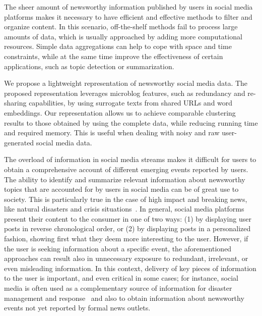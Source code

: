 The sheer amount of newsworthy information published by users in social media
platforms makes it necessary to have efficient and effective methods to filter
and organize content. 
%
In this scenario, off-the-shelf methods fail to process large amounts of data,
which is usually approached by adding more computational resources. 
%
Simple data aggregations can help to cope with space and time constraints,
while at the same time improve the effectiveness of certain applications, such
as topic detection or summarization. 


%
We propose a lightweight representation of newsworthy social media data. 
%
The proposed representation leverages microblog features, such as redundancy
and re-sharing capabilities, by using surrogate texts from shared URLs and word embeddings.
%
Our representation allows us to achieve comparable clustering results to 
those obtained by using the complete data, while reducing running time and 
required memory.
%
This is useful when dealing with noisy and raw user-generated social media data.


The overload of information in social media streams makes it difficult for users
to obtain a comprehensive account of different emerging events reported by
users.
%
%
The ability to identify and summarize relevant information about newsworthy
topics that are accounted for by users in social media can be of great use to
society.
%
This is particularly true in the case of high impact and breaking news, like
natural disasters and crisis situations~\cite{ICWSM1817816}.
%
In general, social media platforms present their content to the consumer in one
of two ways: (1) by displaying user posts in reverse chronological order, or (2)
by displaying posts in a personalized fashion, showing first what they deem more
interesting to the user.
%
However, if the user 
is seeking information about a specific event, the aforementioned approaches can
result also in unnecessary exposure to redundant, irrelevant, or even misleading
information.
%
In this context, delivery of key pieces of information to the user is important,
and even critical in some cases; 
%
for instance, social media is often used as a complementary source of
information for disaster management and
response~\cite{ICWSM1817816,Sarmiento:2018:DDE:3201064.3201077}
and also to obtain information about newsworthy events not yet reported by
formal news outlets. 
%
%

